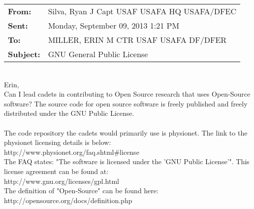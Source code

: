 \documentclass{article}
\begin{document}
\noindent \begin{tabu} to \textwidth{l X[l]}
 
  \textbf{From:} & Silva, Ryan J Capt USAF USAFA HQ USAFA/DFEC  \\
  \textbf{Sent:} & Monday, September 09, 2013 1:21 PM \\
  \textbf{To:} & MILLER, ERIN M CTR USAF USAFA DF/DFER \\
  \textbf{Subject:} & GNU General Public License \\
\end{tabu}
\hspace{0pt} \\

Erin, \\

Can I lead cadets in contributing to Open Source research that uses Open-Source software? The source code for open source software is freely published and freely distributed under the GNU Public License. \\
 \\
The code repository the cadets would primarily use is physionet. The link to the physionet licensing details is below: \\

http://www.physionet.org/faq.shtml\#license \\

\noindent The FAQ states: "The software is licensed under the 'GNU Public License'". This license agreement can be found at: \\

http://www.gnu.org/licenses/gpl.html \\

\noindent The definition of "Open-Source" can be found here: \\

http://opensource.org/docs/definition.php \\
\end{document}
